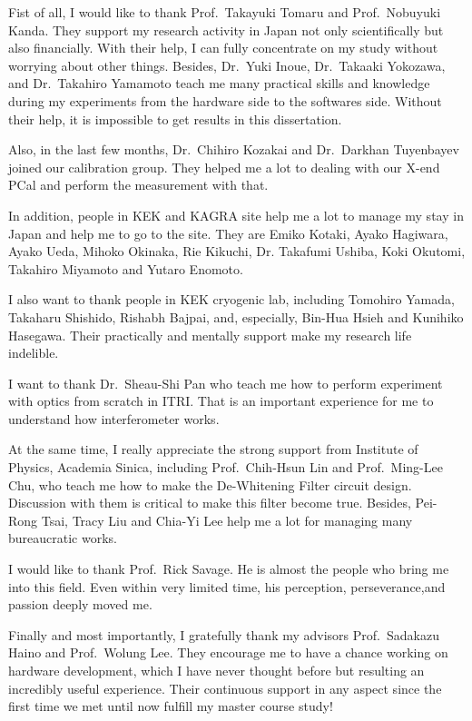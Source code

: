 Fist of all, I would like to thank Prof.~Takayuki Tomaru and Prof.~Nobuyuki Kanda. They support my research activity in Japan not only scientifically but also financially. With their help, I can fully concentrate on my study without worrying about other things. Besides, Dr.~Yuki Inoue, Dr.~Takaaki Yokozawa, and Dr.~Takahiro Yamamoto teach me many practical skills and knowledge during my experiments from the hardware side to the softwares side. Without their help, it is impossible to get results in this dissertation.

Also, in the last few months, Dr.~Chihiro Kozakai and Dr.~Darkhan Tuyenbayev joined our calibration group. They helped me a lot to dealing with our X-end PCal and perform the measurement with that.

In addition, people in KEK and KAGRA site help me a lot to manage my stay in Japan and help me to go to the site. They are Emiko Kotaki, Ayako Hagiwara, Ayako Ueda, Mihoko Okinaka, Rie Kikuchi, Dr. Takafumi Ushiba, Koki Okutomi, Takahiro Miyamoto and Yutaro Enomoto.

I also want to thank people in KEK cryogenic lab, including Tomohiro Yamada, Takaharu Shishido, Rishabh Bajpai, and, especially, Bin-Hua Hsieh and Kunihiko Hasegawa. Their practically and mentally support make my research life indelible.

I want to thank Dr.~Sheau-Shi Pan who teach me how to perform experiment with optics from scratch in ITRI. That is an important experience for me to understand how interferometer works.

At the same time, I really appreciate the strong support from Institute of Physics, Academia Sinica, including Prof.~Chih-Hsun Lin and Prof.~Ming-Lee Chu, who teach me how to make the De-Whitening Filter circuit design. Discussion with them is critical to make this filter become true. Besides, Pei-Rong Tsai, Tracy Liu and Chia-Yi Lee help me a lot for managing many bureaucratic works.

I would like to thank Prof.~Rick Savage. He is almost the people who bring me into this field. Even within very limited time, his perception, perseverance,and passion deeply moved me.

Finally and most importantly, I gratefully thank my advisors Prof.~Sadakazu Haino and Prof.~Wolung Lee. They encourage me to have a chance working on hardware development, which I have never thought before but resulting an incredibly useful experience. Their continuous support in any aspect since the first time we met until now fulfill my master course study!

